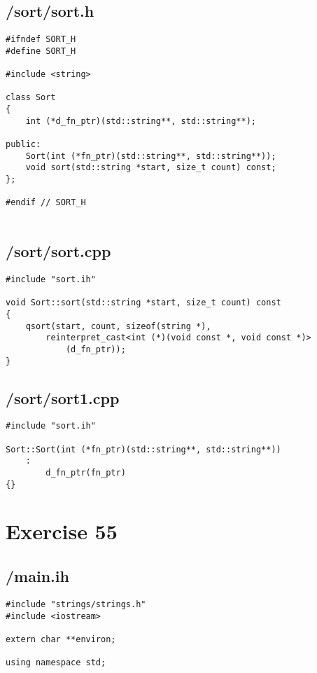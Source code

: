 \documentclass{article}
\begin{document}
\subsection*{/sort/sort.h}
\begin{verbatim}
#ifndef SORT_H
#define SORT_H

#include <string>

class Sort
{
    int (*d_fn_ptr)(std::string**, std::string**);

public:
    Sort(int (*fn_ptr)(std::string**, std::string**));
    void sort(std::string *start, size_t count) const;
};

#endif // SORT_H


\end{verbatim}
\subsection*{/sort/sort.cpp}
\begin{verbatim}
#include "sort.ih"

void Sort::sort(std::string *start, size_t count) const
{   
    qsort(start, count, sizeof(string *), 
        reinterpret_cast<int (*)(void const *, void const *)>
            (d_fn_ptr));
}
\end{verbatim}
\subsection*{/sort/sort1.cpp}
\begin{verbatim}
#include "sort.ih"

Sort::Sort(int (*fn_ptr)(std::string**, std::string**))
    :
        d_fn_ptr(fn_ptr)
{}

\end{verbatim}


\section*{Exercise 55}
\subsection*{/main.ih}
\begin{verbatim}
#include "strings/strings.h"
#include <iostream>

extern char **environ;

using namespace std;

\end{verbatim}
\end{document}
